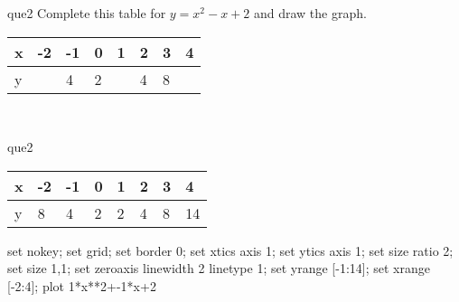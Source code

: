 \documentclass[13.5pt, varwidth=true]{beamer}
\begin{document}
\begin{frame}[shrink=19,fragile]
	\begin{beamercolorbox}[rounded=true, left, shadow=true,wd=14.8cm]{que2}
		 Complete this table for $y = x^{2} - x + 2$ and draw the graph. \\[0.3cm] \renewcommand{\arraystretch}{1.2}\begin{tabular}{|C|C|C|C|C|C|C|C|} \hline x & -2 & -1 & 0 & 1 & 2 & 3 & 4 \\ \hline y &  & 4 & 2 &  & 4 & 8 & \\ \hline \end{tabular}\\[0.3cm]
	\end{beamercolorbox}
\end{frame}
\begin{frame}[shrink=19,fragile]
	\begin{beamercolorbox}[rounded=true, left, shadow=true,wd=14.8cm]{que2}
 		\renewcommand{\arraystretch}{1.2}\begin{tabular}{|C|C|C|C|C|C|C|C|} \hline x & -2 & -1 & 0 & 1 & 2 & 3 & 4 \\ \hline y & 8 & 4 & 2 & 2 & 4 & 8 & 14\\ \hline \end{tabular}\begin{gnuplot}[terminal=pdf] set nokey; set grid; set border 0; set xtics axis 1; set ytics axis 1; set size ratio 2; set size 1,1; set zeroaxis linewidth 2 linetype 1; set yrange [-1:14]; set xrange [-2:4]; plot 1*x**2+-1*x+2 \end{gnuplot}
	\end{beamercolorbox}
\end{frame}
\end{document}
